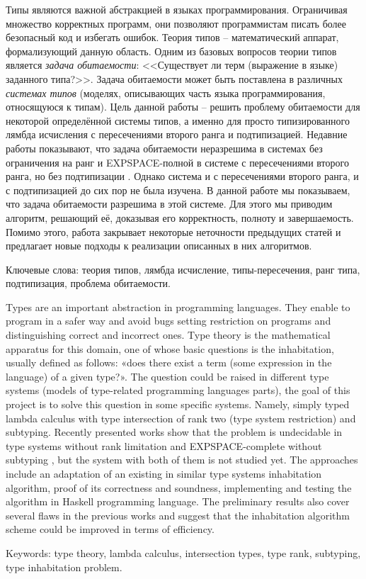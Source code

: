 \documentclass[../main.tex]{subfiles}
\begin{document}
Типы являются важной абстракцией в языках программирования. Ограничивая множество корректных программ, они позволяют программистам писать более безопасный код и избегать ошибок. Теория типов -- математический аппарат, формализующий данную область. Одним из базовых вопросов теории типов является {\it задача обитаемости}: <<Существует ли терм (выражение в языке) заданного типа?>>. Задача обитаемости может быть поставлена в различных {\it системах типов} (моделях, описывающих часть языка программирования, относящуюся к типам). Цель данной работы -- решить проблему обитаемости для некоторой определённой системы типов, а именно для просто типизированного лямбда исчисления с пересечениями второго ранга и подтипизацией. Недавние работы показывают, что задача обитаемости неразрешима в системах без ограничения на ранг \cite{urzyczyn_1997} и EXPSPACE-полной в системе с пересечениями второго ранга, но без подтипизации \cite{kusmierek_2007, urzyczyn_2009}. Однако система и с пересечениями второго ранга, и с подтипизацией до сих пор не была изучена. В данной работе мы показываем, что задача обитаемости разрешима в этой системе. Для этого мы приводим алгоритм, решающий её, доказывая его корректность, полноту и завершаемость. Помимо этого, работа закрывает некоторые неточности предыдущих статей и предлагает новые подходы к реализации описанных в них алгоритмов.

\vspace*{\fill}

Ключевые слова: теория типов, лямбда исчисление, типы-пересечения, ранг типа, подтипизация, проблема обитаемости.


\newpage

Types are an important abstraction in programming languages. They enable to program in a safer way and avoid bugs setting restriction on programs and distinguishing correct and incorrect ones. Type theory is the mathematical apparatus for this domain, one of whose basic questions is the inhabitation, usually defined as follows: «does there exist a term (some expression in the language) of a given type?». The question could be raised in different type systems (models of type-related programming languages parts), the goal of this project is to solve this question in some specific systems. Namely, simply typed lambda calculus with type intersection of rank two (type system restriction) and subtyping. Recently presented works show that the problem is undecidable in type systems without rank limitation \cite{urzyczyn_1997} and EXPSPACE-complete without subtyping \cite{kusmierek_2007, urzyczyn_2009}, but the system with both of them is not studied yet. The approaches include an adaptation of an existing in similar type systems inhabitation algorithm, proof of its correctness and soundness, implementing and testing the algorithm in Haskell programming language. The preliminary results also cover several flaws in the previous works and suggest that the inhabitation algorithm scheme could be improved in terms of efficiency.

\vspace*{\fill}

Keywords: type theory, lambda calculus, intersection types, type rank, subtyping, type inhabitation problem.
\end{document}

